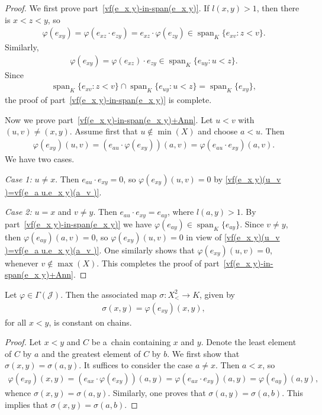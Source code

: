 \documentclass{jonasart}
\newcommand{\G}{\Gamma}
\newcommand{\J}{\mathcal{J}}
\newcommand{\sg}{\sigma}
\newcommand{\vf}{\varphi}
\DeclareMathOperator{\spn}{span}
\begin{document}
	\begin{proof}
		We first prove part~\eqref{vf(e_x y)-in-span(e_x y)}. If $l(x,y)>1$, then there is $x<z<y$, so
		\begin{align*}
			\vf(e_{xy})=\vf(e_{xz}\cdot e_{zy})=e_{xz}\cdot\vf(e_{zy})\in\spn_K\{e_{xv}:z<v\}.
		\end{align*}
		Similarly,
		\begin{align*}
			\vf(e_{xy})=\vf(e_{xz})\cdot e_{zy}\in\spn_K\{e_{uy}:u<z\}.
		\end{align*}
		Since
		\begin{align*}
			\spn_K\{e_{xv}:z<v\}\cap\spn_K\{e_{uy}:u<z\}=\spn_K\{e_{xy}\},
		\end{align*}
		the proof of part~\eqref{vf(e_x y)-in-span(e_x y)} is complete.

		Now we prove part~\eqref{vf(e_x y)-in-span(e_x y)+Ann}. Let $u<v$ with $(u,v)\ne(x,y)$. Assume first that $u\not\in\min(X)$ and choose $a<u$. Then
		\begin{align}\label{vf(e_x y)(u_v )=vf(e_a u.e_x y)(a_v )}
			\vf(e_{xy})(u,v)=(e_{au}\cdot\vf(e_{xy}))(a,v)=\vf(e_{au}\cdot e_{xy})(a,v).
		\end{align}
		We have two cases.

		\textit{Case 1:} $u\ne x$. Then $e_{au}\cdot e_{xy}=0$, so $\vf(e_{xy})(u,v)=0$ by \eqref{vf(e_x y)(u_v )=vf(e_a u.e_x y)(a_v )}.

		\textit{Case 2:} $u=x$ and $v\ne y$. Then $e_{au}\cdot e_{xy}=e_{ay}$, where $l(a,y)>1$. By part~\eqref{vf(e_x y)-in-span(e_x y)} we have $\vf(e_{ay})\in\spn_K\{e_{ay}\}$. Since $v\ne y$, then $\vf(e_{ay})(a,v)=0$, so $\vf(e_{xy})(u,v)=0$ in view of \eqref{vf(e_x y)(u_v )=vf(e_a u.e_x y)(a_v )}. One similarly shows that $\vf(e_{xy})(u,v)=0$, whenever $v\not\in\max(X)$. This completes the proof of part~\eqref{vf(e_x y)-in-span(e_x y)+Ann}.
	\end{proof}

	\begin{lemma}\label{from-vf-to-sg}
		Let $\vf\in\G(\J)$. Then the associated map $\sg:X^2_<\to K$, given by
		\begin{align*}
			\sg(x,y)=\vf(e_{xy})(x,y),
		\end{align*}
		for all $x<y$, is constant on chains.
	\end{lemma}

	\begin{proof}
		Let $x<y$ and $C$ be a~chain containing $x$ and $y$. Denote the least element of $C$ by $a$ and the greatest element of $C$ by $b$. We first show that $\sg(x,y)=\sg(a,y)$. It suffices to consider the case $a\ne x$. Then $a<x$, so
		\begin{align*}
			\vf(e_{xy})(x,y)=(e_{ax}\cdot\vf(e_{xy}))(a,y)=\vf(e_{ax}\cdot e_{xy})(a,y)=\vf(e_{ay})(a,y),
		\end{align*}
		whence $\sg(x,y)=\sg(a,y)$. Similarly, one proves that $\sg(a,y)=\sg(a,b)$. This implies that $\sg(x,y)=\sg(a,b)$.
	\end{proof}
\end{document}
